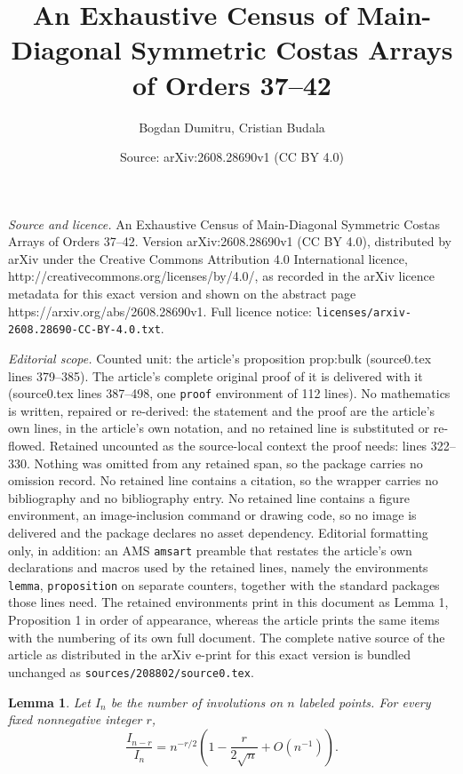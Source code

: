\documentclass[10pt,a4paper]{amsart}
\title{An Exhaustive Census of Main-Diagonal Symmetric Costas Arrays of Orders 37--42}
\author{Bogdan Dumitru, Cristian Budala}
\date{Source: arXiv:2608.28690v1 (CC BY 4.0)}
\newtheorem{lemma}{Lemma}
\begin{document}
\maketitle

\noindent\emph{Source and licence.} An Exhaustive Census of Main-Diagonal Symmetric Costas Arrays of Orders 37--42. Version arXiv:2608.28690v1 (CC BY 4.0), distributed by arXiv under the Creative Commons Attribution 4.0 International licence, http://creativecommons.org/licenses/by/4.0/, as recorded in the arXiv licence metadata for this exact version and shown on the abstract page https://arxiv.org/abs/2608.28690v1. Full licence notice: \texttt{licenses/arxiv-2608.28690-CC-BY-4.0.txt}.\par\smallskip

\noindent\textit{Editorial scope.} Counted unit: the article's proposition prop:bulk (source0.tex lines 379--385). The article's complete original proof of it is delivered with it (source0.tex lines 387--498, one \texttt{proof} environment of 112 lines). No mathematics is written, repaired or re-derived: the statement and the proof are the article's own lines, in the article's own notation, and no retained line is substituted or re-flowed.  Retained uncounted as the source-local context the proof needs: lines 322--330.  Nothing was omitted from any retained span, so the package carries no omission record.  No retained line contains a citation, so the wrapper carries no bibliography and no bibliography entry.  No retained line contains a figure environment, an image-inclusion command or drawing code, so no image is delivered and the package declares no asset dependency.  Editorial formatting only, in addition: an AMS \texttt{amsart} preamble that restates the article's own declarations and macros used by the retained lines, namely the environments \texttt{lemma}, \texttt{proposition} on separate counters, together with the standard packages those lines need.  The retained environments print in this document as Lemma 1, Proposition 1 in order of appearance, whereas the article prints the same items with the numbering of its own full document.  The complete native source of the article as distributed in the arXiv e-print for this exact version is bundled unchanged as \texttt{sources/208802/source0.tex}.
\begin{lemma}
\label{lem:involution-ratio}
Let $I_n$ be the number of involutions on $n$ labeled points.  For every
fixed nonnegative integer $r$,
\[
\frac{I_{n-r}}{I_n}
=n^{-r/2}\left(1-\frac{r}{2\sqrt n}+O(n^{-1})\right).
\]
\end{lemma}
\end{document}

